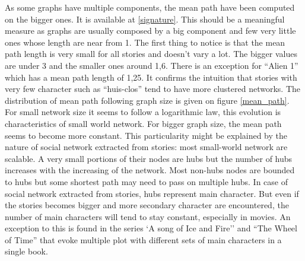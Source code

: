 \documentclass[a4paper, 12pt]{report}
\begin{document}
As some graphs have multiple components, the mean path have been computed on the bigger ones. It is available at \ref{signature}. This should be a meaningful measure as graphs are usually composed by a big component and few very little ones whose length are near from 1. The first thing to notice is that the mean path length is very small for all stories and doesn't vary a lot. The bigger values are under 3 and the smaller ones around 1,6. There is an exception for ``Alien 1'' which has a mean path length of 1,25. It confirms the intuition that stories with very few character such as ``huis-clos'' tend to have more clustered networks. 
The distribution of mean path following graph size is given on figure \ref{mean_path}.
For small network size it seems to follow a logarithmic law, this evolution is characteristics of small world network. 
For bigger graph size, the mean path seems to become more constant. This particularity might be explained by the nature of social network extracted from stories: most small-world network are scalable. 
A very small portions of their nodes are hubs but the number of hubs increases with the increasing of the network. Most non-hubs nodes are bounded to hubs but some shortest path may need to pass on multiple hubs. 
In case of social network extracted from stories, hubs represent main character.
But even if the stories becomes bigger and more secondary character are encountered, the number of main characters will tend to stay constant, especially in movies. 
An exception to this is found in the series `A song of Ice and Fire'' and ``The Wheel of Time'' that evoke multiple plot with different sets of main characters in a single book.


\listoffigures

\listoftables

 
\end{document}
